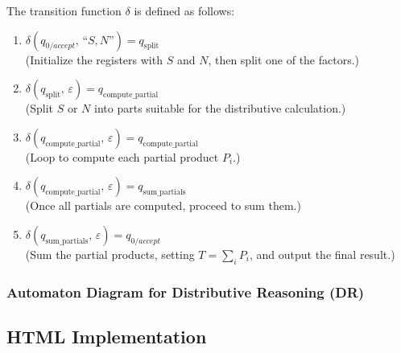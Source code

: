 \documentclass[11pt]{article}
\begin{document}
The transition function \(\delta\) is defined as follows:
\begin{enumerate}
    \item \(\delta(q_{0/accept},\, \text{``}S,N\text{''}) = q_{\text{split}}\) \\
          (Initialize the registers with \(S\) and \(N\), then split one of the factors.)
    \item \(\delta(q_{\text{split}},\, \varepsilon) = q_{\text{compute\_partial}}\) \\
          (Split \(S\) or \(N\) into parts suitable for the distributive calculation.)
    \item \(\delta(q_{\text{compute\_partial}},\, \varepsilon) = q_{\text{compute\_partial}}\) \\
          (Loop to compute each partial product \(P_i\).)
    \item \(\delta(q_{\text{compute\_partial}},\, \varepsilon) = q_{\text{sum\_partials}}\) \\
          (Once all partials are computed, proceed to sum them.)
    \item \(\delta(q_{\text{sum\_partials}},\, \varepsilon) = q_{0/accept}\) \\
          (Sum the partial products, setting \(T = \sum_i P_i\), and output the final result.)
\end{enumerate}

\subsubsection*{Automaton Diagram for Distributive Reasoning (DR)}



\subsection*{HTML Implementation}


\printbibliography
\end{document}
